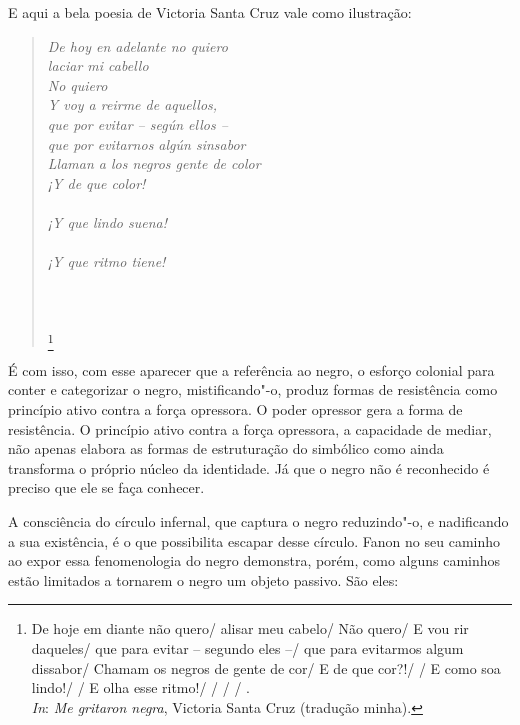 E aqui a bela poesia de Victoria Santa Cruz vale como ilustração:

\begin{verse}
\emph{De hoy en adelante no quiero\\
laciar mi cabello\\
No quiero\\
Y voy a reirme de aquellos,\\
que por evitar -- según ellos --\\
que por evitarnos algún sinsabor\\
Llaman a los negros gente de color\\
¡Y de que color!\\
\\
¡Y que lindo suena!\\
\\
¡Y que ritmo tiene!\\
   \\
   \\
   \\
  }\footnote{De hoje em diante não quero/
  alisar meu cabelo/
  Não quero/
  E vou rir daqueles/
  que para evitar -- segundo eles --/
  que para evitarmos algum dissabor/
  Chamam os negros de gente de cor/
  E de que cor?!/
  /
  E como soa lindo!/
  /
  E olha esse ritmo!/
     /
     /
     /
    .\\
  \emph{In}: \emph{Me gritaron negra}, Victoria Santa Cruz (tradução minha).}
  \end{verse}

É com isso, com esse aparecer que
a referência ao negro, o esforço colonial para conter e categorizar o
negro, mistificando"-o, produz formas de resistência como princípio ativo
contra a força opressora. O poder opressor gera a forma de resistência.
O princípio ativo contra a força opressora, a capacidade de mediar, não
apenas elabora as formas de estruturação do simbólico como ainda
transforma o próprio núcleo da identidade. Já que o negro não é
reconhecido é preciso que ele se faça conhecer.

A consciência do círculo infernal, que captura o negro reduzindo"-o, e
nadificando a sua existência, é o que possibilita escapar desse círculo.
Fanon no seu caminho ao expor essa fenomenologia do negro demonstra,
porém, como alguns caminhos estão limitados a tornarem o negro um objeto
passivo. São eles:

